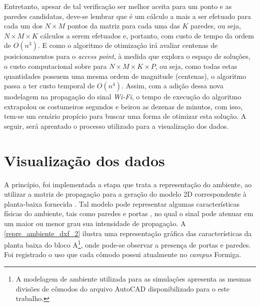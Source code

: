 \documentclass[
	12pt,				%
	twoside,			%
	a4paper,			%
	english,			%
	french,				%
	spanish,			%
	brazil				%
	]{abntex2}
\begin{document}
Entretanto, apesar de tal verificação ser melhor aceita para um ponto e
as paredes candidatas, deve-se lembrar que é um cálculo a mais a ser
efetuado para cada um dos \(N \times M\) pontos da matriz para cada uma
das \(K\) paredes, ou seja, \(N \times M \times K\) cálculos a serem
efetuados e, portanto, com custo de tempo da ordem de \(O(n^{3})\). E
como o algoritmo de otimização irá avaliar centenas de posicionamentos
para o \emph{access point}, à medida que explora o espaço de soluções, o
custo computacional sobre para \(N \times M \times K \times P\), ou
seja, como todas estas quantidades possuem uma mesma ordem de magnitude
(centenas), o algoritmo passa a ter custo temporal de \(O(n^{4})\).
Assim, com a adição dessa nova modelagem na propagação do sinal
\emph{Wi-Fi}, o tempo de execução do algoritmo extrapolou os costumeiros
segundos e beirou as dezenas de minutos, com isso, tem-se um cenário
propício para buscar uma forma de otimizar esta solução. A seguir, será
aprentado o processo utilizado para a visualização dos dados.

\section{Visualização dos dados}\label{visualizauxe7uxe3o-dos-dados}

A princípio, foi implementada a etapa que trata a representação do
ambiente, ao utilizar a matriz de propagação para a geração do modelo 2D
correspondente à planta-baixa fornecida \cite{KASE,THAKUR}. Tal modelo
pode representar algumas características físicas do ambiente, tais como
paredes e portas \cite{MARSCHALLINGER}, no qual o sinal pode atenuar em
um maior ou menor grau sua intensidade de propagação. A
\autoref{repre_ambiente_dxf_2} ilustra uma representação gráfica das
características da planta baixa do bloco A\footnote{A modelagem de
  ambiente utilizada para as simulações apresenta as mesmas divisões de
  cômodos do arquivo AutoCAD disponibilizado para o este trabalho.},
onde pode-se observar a presença de portas e paredes. Foi registrado o
uso que cada cômodo possui atualmente no \emph{campus} Formiga.
\end{document}
